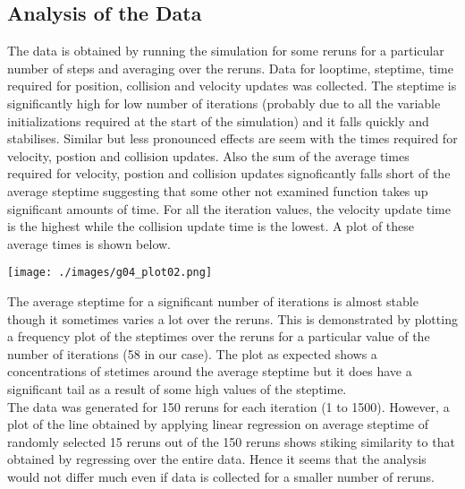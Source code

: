 \documentclass[11pt]{article}
\begin{document}
\subsection{Analysis of the Data}
The data is obtained by running the simulation for some reruns for a particular number of steps and averaging over the reruns. Data for looptime, steptime, time required for position, collision and velocity updates was collected. The steptime is significantly high for low number of iterations (probably due to all the variable initializations required at the start of the simulation) and it falls quickly and stabilises. Similar but less pronounced effects are seem with the times required for velocity, postion and collision updates. Also the sum of the average times required for velocity, postion and collision updates signoficantly falls short of the average steptime suggesting that some other not examined function takes up significant amounts of time. For all the iteration values, the velocity update time is the highest while the collision update time is the lowest. A plot of these average times is shown below.
\\
\begin{center}
	\texttt{[image: ./images/g04\_plot02.png]}
\end{center}
\indent The average steptime for a significant number of iterations is almost stable though it sometimes varies a lot over the reruns. This is demonstrated by plotting a frequency plot of the steptimes over the reruns for a particular value of the number of iterations (58 in our case). The plot as expected shows a concentrations of stetimes around the average steptime but it does have a significant tail as a result of some high values of the steptime.
\\
\indent The data was generated for 150 reruns for each iteration (1 to 1500). However, a plot of the line obtained by applying linear regression on  average steptime of randomly selected 15 reruns out of the 150 reruns shows stiking similarity to that obtained by regressing over the entire data. Hence it seems that the analysis would not differ much even if data is collected for a smaller number of reruns.
\end{document}
